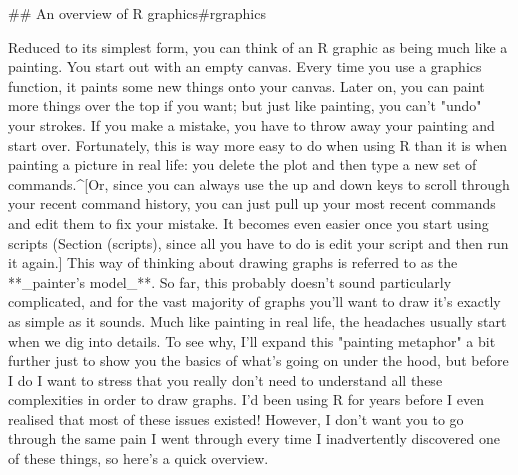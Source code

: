## An overview of R graphics{#rgraphics}

Reduced to its simplest form, you can think of an R graphic as being much like a painting. You start out with an empty canvas. Every time you use a graphics function, it paints some new things onto your canvas. Later on, you can paint more things over the top if you want; but just like painting, you can't "undo" your strokes. If you make a mistake, you have to throw away your painting and start over. Fortunately, this is way more easy to do when using R than it is when painting a picture in real life: you delete the plot and then type a new set of commands.^[Or, since you can always use the up and down keys to scroll through your recent command history, you can just pull up your most recent commands and edit them to fix your mistake. It becomes even easier once you start using scripts (Section \@ref(scripts), since all you have to do is edit your script and then run it again.] This way of thinking about drawing graphs is referred to as the **_painter's model_**. So far, this probably doesn't sound particularly complicated, and for the vast majority of graphs you'll want to draw it's exactly as simple as it sounds. Much like painting in real life, the headaches usually start when we dig into details. To see why, I'll  expand this "painting metaphor" a bit further just to show you the basics of what's going on under the hood, but before I do I want to stress that you really don't need to understand all these complexities in order to draw graphs. I'd been using R for years before I even realised that most of these issues existed! However, I don't want you to go through the same pain I went through every time I inadvertently discovered one of these things, so here's a quick overview.

